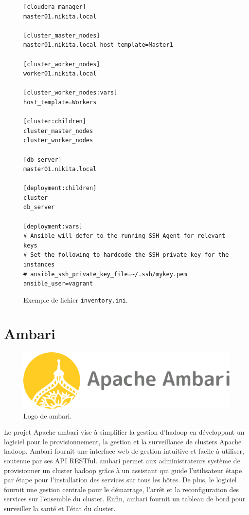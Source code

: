 \documentclass[12pt, french]{report}
\begin{document}
\begin{figure}[h]
\begin{verbatim}
[cloudera_manager]
master01.nikita.local

[cluster_master_nodes]
master01.nikita.local host_template=Master1

[cluster_worker_nodes]
worker01.nikita.local

[cluster_worker_nodes:vars]
host_template=Workers

[cluster:children]
cluster_master_nodes
cluster_worker_nodes

[db_server]
master01.nikita.local

[deployment:children]
cluster
db_server

[deployment:vars]
# Ansible will defer to the running SSH Agent for relevant keys
# Set the following to hardcode the SSH private key for the instances
# ansible_ssh_private_key_file=~/.ssh/mykey.pem  
ansible_user=vagrant
\end{verbatim}
\centering
\caption{Exemple de fichier \texttt{inventory.ini}.}
\label{fig:example-ansible-inventory}
\end{figure}

\section{Ambari}

\begin{figure}[H]
\includegraphics[scale=0.2]{assets/img/logo-ambari.png}
\centering
\caption{Logo de \gls{ambari}.}
\label{fig:logo-ambari}
\end{figure}

Le projet Apache \gls{ambari} vise à simplifier la gestion d'\gls{hadoop} en développant un logiciel pour le provisionnement, la gestion et la surveillance de clusters Apache \gls{hadoop}. Ambari fournit une interface web de gestion intuitive et facile à utiliser, soutenue par ses API RESTful. \gls{ambari} permet aux administrateurs système de provisionner un cluster \gls{hadoop} grâce à un assistant qui guide l'utilisateur étape par étape pour l'installation des services sur tous les hôtes. De plus, le logiciel fournit une gestion centrale pour le démarrage, l'arrêt et la reconfiguration des services sur l'ensemble du cluster. Enfin, \gls{ambari} fournit un tableau de bord pour surveiller la santé et l'état du cluster.
\end{document}

